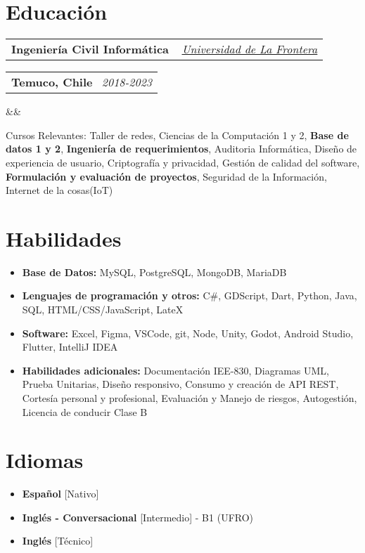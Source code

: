 \documentclass[11pt,a4paper,sans]{moderncv}
\makeatletter
\newcommand*{\customcventry}[7][.13em]{
    \begin{tabular}{@{}l}
    {\bfseries #4} \
    {\itshape #3}
    \end{tabular}
    \hfill
    \begin{tabular}{l@{}}
    {\bfseries #5} \
    {\itshape #2}
    \end{tabular}
    \ifx&#7&%
    \else{\
    \begin{minipage}{\maincolumnwidth}%
    \small#7%
    \end{minipage}}\fi%
    \par\addvspace{#1}
}
\makeatother
\begin{document}
\section{Educación}{
    \customcventry
        {2018-2023}
        { \href{https://1drv.ms/b/c/13c8ae619d64655e/EV5lZJ1hrsgggBOHLAAAAAABHh9OZUbWLd2nx7PTa_OSsg?e=Fedmge}
        {\underline{Universidad de La Frontera}} }
        {Ingeniería Civil Informática}
        {Temuco, Chile}{}{}
        {Cursos Relevantes: 
            Taller de redes, 
            Ciencias de la Computación 1 y 2, 
            \textbf{Base de datos 1 y 2}, 
            \textbf{Ingeniería de requerimientos},
            Auditoria Informática, 
            Diseño de experiencia de usuario, 
            Criptografía y privacidad, 
            Gestión de calidad del software, 
            \textbf{Formulación y evaluación de proyectos},
            Seguridad de la Información,
            Internet de la cosas(IoT)
    }
}

\section{Habilidades}{
    \begin{itemize}[label=\textbullet]
        \item {\textbf{Base de Datos:} 
            MySQL, 
            PostgreSQL, 
            MongoDB, 
            MariaDB
        }
        \item {\textbf{Lenguajes de programación y otros:} 
            C\#, 
            GDScript, 
            Dart, 
            Python, 
            Java,
            SQL,
            HTML/CSS/JavaScript,
            LateX
        }
        \item {\textbf{Software:}  
            Excel,  
            Figma, 
            VSCode, 
            git,
            Node,
            Unity,
            Godot,
            Android Studio,
            Flutter,
            IntelliJ IDEA
        }
        \item {\textbf{Habilidades adicionales:} 
            Documentación IEE-830,
            Diagramas UML,
            Prueba Unitarias,
            Diseño responsivo,
            Consumo y creación de API REST,
            Cortesía personal y profesional, 
            Evaluación y Manejo de riesgos,  
            Autogestión, 
            Licencia de conducir Clase B
        }
    \end{itemize}
}

\section{Idiomas}{
    \begin{multicols}{2}
        \begin{itemize}[label=\textbullet]
        \item \textbf{Español} [Nativo]
        \item \textbf{Inglés - Conversacional} [Intermedio] - B1 (UFRO)
        \item \textbf{Inglés} [Técnico]
        \end{itemize}
    \end{multicols}
}
\end{document}
